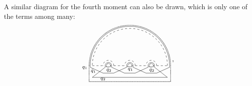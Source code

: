 \documentclass[aps,pra,reprint,superscriptaddress,twocolumn,notitlepage]{revtex4-1}
\numberwithin{equation}{section}
\begin{document}
A similar diagram for the fourth moment can also be drawn, which is only one of the terms among many: 
\begin{equation}\label{eq:fourth_moment_dominant_large_A1}
    \tikz[scale=0.55,baseline=1.5ex]{
    \draw[dashed] (0,0) -- (1,0);
    \draw (-0.2,0.)-- (-0.2,-0.15);
    \draw (-0.2,-0.15)-- (1.,-0.7);
    \draw (1.2,-0.15)-- (1.2,0.0);
    \draw (1.2,-0.15)-- (0,-1.1);
    \draw[densely dotted,thick] (-0.3,0.)-- (-0.3,-1.5);
    \draw[densely dotted,thick] (1.3,-0.1)-- (1.3,0.);
    \draw[dashed] (2,0) -- (3,0);
    \draw (1.8,0.)-- (1.8,-0.15);
    \draw (1.8,-0.15)-- (3.,-0.7);
    \draw (3.2,-0.15)-- (3.2,0.);
    \draw (3.2,-0.15)-- (2,-0.7);
    \draw[densely dotted,thick] (1.7,0.)-- (1.7,-0.1);
    \draw[densely dotted,thick] (3.3,-0.1)-- (3.3,0.);
    \draw[dashed] (4,0) -- (5,0);
    \draw (3.8,0.)-- (3.8,-0.15);
    \draw (3.8,-0.15)-- (5.,-0.7);
    \draw (5.2,-0.15)-- (5.2,0.);
    \draw (5.2,-0.15)-- (4,-0.7);
    \draw[densely dotted,thick] (3.7,0.)-- (3.7,-0.1);
    \draw[densely dotted,thick] (5.3,-0.1)-- (5.3,0.);
    \draw[dashed] (6,0) -- (7,0);
    \draw (5.8,0.)-- (5.8,-0.15);
    \draw (5.8,-0.15)-- (7.,-1.1);
    \draw (7.2,-0.15)-- (7.2,0.);
    \draw (7.2,-0.15)-- (6,-0.7);
    \draw[densely dotted,thick] (5.7,0.)-- (5.7,-0.1);
    \draw[densely dotted,thick] (7.3,-1.5)-- (7.3,0.);
    \draw[densely dotted,thick] (1.3,-0.1)--(1.7,-0.1);
    \draw[densely dotted,thick] (3.3,-0.1)--(3.7,-0.1);
    \draw[densely dotted,thick] (5.3,-0.1)--(5.7,-0.1);
    \draw[densely dotted,thick] (-0.3,-1.5)--(7.3,-1.5);
    \draw (1.0,-0.7)-- (2,-0.7);
    \draw (3.0,-0.7)-- (4,-0.7);
    \draw (5.0,-0.7)-- (6,-0.7);
    \draw (0.0,-1.1)-- (7,-1.1);
    \draw[densely dotted,thick] (7.3,0) arc (0:180:3.8);
    \draw[densely dotted,thick] (1.7,0) arc (0:180:0.2);
    \draw[densely dotted,thick] (3.7,0) arc (0:180:0.2);
    \draw[densely dotted,thick] (5.7,0) arc (0:180:0.2);
    \draw[dashed] (6.0,0) arc (0:180:0.5);
    \draw[dashed] (4.0,0) arc (0:180:0.5);
    \draw[dashed] (2.0,0) arc (0:180:0.5);
    \draw[dashed] (7.0,0) arc (0:180:3.5);
    \draw (5.8,0) arc (0:180:0.3);
    \draw (3.8,0) arc (0:180:0.3);
    \draw (1.8,0) arc (0:180:0.3);
    \draw (7.2,0) arc (0:180:3.7);
    \draw (-0.7,-0.2) circle (0.) node[anchor=center] {\scriptsize$q_1$};
    \draw (1.55,-0.4) circle (0.) node[anchor=center] {\scriptsize$\bar{q}_2$};
    \draw (3.55,-0.35) circle (0.) node[anchor=center] {\scriptsize$q_1$};
    \draw (5.55,-0.4) circle (0.) node[anchor=center] {\scriptsize$\bar{q}_2$};
    \draw (.1,-.5) circle (0.) node[anchor=center] {\scriptsize$\bar{q}_1$};
    \draw (1.,-1.25) circle (0.) node[anchor=center] {\scriptsize$q_2$};
 }\, ,
\end{equation}
\end{document}
